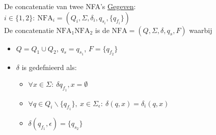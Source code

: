 \begin{pro}{De concatenatie van twee NFA's}
    \underline{Gegeven}: $i \in \{1,2\}: \ \text{NFA}_i = (Q_i,\Sigma, \delta_i, q_{s_i}, \{q_{f_i}\})$ \\

    De concatenatie $\text{NFA}_1\text{NFA}_2$ is de $\text{NFA} = (Q,\Sigma, \delta, q_s, F)$ waarbij \\

    \vspace{-0.2cm}
    \begin{minipage}{.6\textwidth}
        \begin{itemize}
            \item $Q = Q_1 \cup Q_2$, $q_s = q_{s_1}$, $F = \{q_{f_2}\}$
            \item 
                $\delta$ is gedefnieerd als:
                \begin{itemize}
                    \item $\forall x \in \Sigma: \ \delta{q_{f_1}, x} = \emptyset$
                    \item $\forall q \in Q_{i}\backslash \{q_{f_1}\}, \ x \in \Sigma_{\epsilon}: \ \delta(q,x) = \delta_i(q,x)$
                    \item $\delta(q_{f_1}, \epsilon) = \{q_{s_2}\}$
                \end{itemize}
        \end{itemize}

\end{minipage}
\end{pro}
